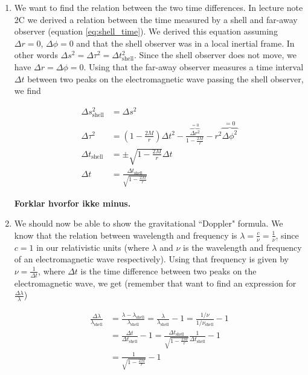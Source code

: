 \documentclass[a4paper,10pt,english]{article}
\begin{document}
\begin{enumerate}

\item We want to find the relation between the two time differences. In lecture note 2C we derived a relation between the time measured by a shell and far-away observer (equation \ref{eq:shell_time}). We derived this equation assuming $\Delta r=0$, $\Delta\phi=0$ and that the shell observer was in a local inertial frame. In other words $\Delta s^{2}=\Delta\tau^{2}=\Delta t_{\text{shell}}^{2}$. Since the shell observer does not move, we have $\Delta r=\Delta \phi=0$. Using that the far-away observer measures a time interval $\Delta t$ between two peaks on the electromagnetic wave passing the shell observer, we find 

\begin{align*}
\Delta s_{\text{shell}}^{2}&=\Delta s^{2}\\
\Delta\tau^{2}&=\left(1-\frac{2M}{r}\right)\Delta t^{2}-\frac{\overbrace{\Delta r^{2}}^{=0}}{1-\frac{2M}{r}}-r^{2}\overbrace{\Delta\phi^{2}}^{=0}\\
\Delta t_{\text{shell}}&=\pm\sqrt{1-\frac{2M}{r}}\Delta t\\
\Delta t&=\frac{\Delta t_{\text{shell}}}{\sqrt{1-\frac{2M}{r}}}
\end{align*}

\textbf{Forklar hvorfor ikke minus.}

\item We should now be able to show the gravitational ``Doppler" formula. We know that the relation between wavelength and frequency is $\lambda=\frac{c}{\nu}=\frac{1}{\nu}$, since $c=1$ in our relativistic units (where $\lambda$ and $\nu$ is the wavelength and frequency of an electromagnetic wave respectively). Using that frequency is given by $\nu=\frac{1}{\Delta t}$, where $\Delta t$ is the time difference between two peaks on the electromagnetic wave, we get (remember that want to find an expression for $\frac{\Delta \lambda}{\lambda}$)

\begin{align*}
\frac{\Delta \lambda}{\lambda_{\text{shell}}}&=\frac{\lambda-\lambda_{\text{shell}}}{\lambda_{\text{shell}}}=\frac{\lambda}{\lambda_{\text{shell}}}-1=\frac{1/\nu}{1/\nu_{\text{shell}}}-1\\
&=\frac{\Delta t}{\Delta t_{\text{shell}}}-1=\frac{\Delta t_{\text{shell}}}{\sqrt{1-\frac{2M}{r}}}\frac{1}{\Delta t_{\text{shell}}}-1\\
&=\frac{1}{\sqrt{1-\frac{2M}{r}}}-1
\end{align*}


\end{enumerate}
\end{document}
